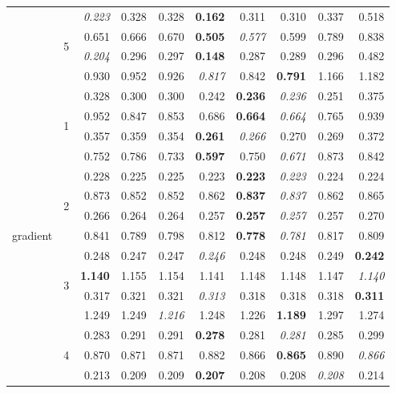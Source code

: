 \documentclass[authoryear, review, 11pt]{elsarticle}
\begin{document}
\begin{table}
\begin{center}
{\begin{tabular}{ccrrrrrrrr}
  \cline{3-10}
   & \multirow{4}{*}{5} & \emph{0.223} & 0.328 & 0.328 & \textbf{0.162} & 0.311 & 0.310 & 0.337 & 0.518 \\ 
   &  & 0.651 & 0.666 & 0.670 & \textbf{0.505} & \emph{0.577} & 0.599 & 0.789 & 0.838 \\ 
   &  & \emph{0.204} & 0.296 & 0.297 & \textbf{0.148} & 0.287 & 0.289 & 0.296 & 0.482 \\ 
   &  & 0.930 & 0.952 & 0.926 & \emph{0.817} & 0.842 & \textbf{0.791} & 1.166 & 1.182 \\ 
  \hline
  \multirow{20}{*}{gradient} & \multirow{4}{*}{1} & 0.328 & 0.300 & 0.300 & 0.242 & \textbf{0.236} & \emph{0.236} & 0.251 & 0.375 \\ 
   &  & 0.952 & 0.847 & 0.853 & 0.686 & \textbf{0.664} & \emph{0.664} & 0.765 & 0.939 \\ 
   &  & 0.357 & 0.359 & 0.354 & \textbf{0.261} & \emph{0.266} & 0.270 & 0.269 & 0.372 \\ 
   &  & 0.752 & 0.786 & 0.733 & \textbf{0.597} & 0.750 & \emph{0.671} & 0.873 & 0.842 \\ 
  \cline{3-10}
   & \multirow{4}{*}{2} & 0.228 & 0.225 & 0.225 & 0.223 & \textbf{0.223} & \emph{0.223} & 0.224 & 0.224 \\ 
   &  & 0.873 & 0.852 & 0.852 & 0.862 & \textbf{0.837} & \emph{0.837} & 0.862 & 0.865 \\ 
   &  & 0.266 & 0.264 & 0.264 & 0.257 & \textbf{0.257} & \emph{0.257} & 0.257 & 0.270 \\ 
   &  & 0.841 & 0.789 & 0.798 & 0.812 & \textbf{0.778} & \emph{0.781} & 0.817 & 0.809 \\ 
  \cline{3-10}
   & \multirow{4}{*}{3} & 0.248 & 0.247 & 0.247 & \emph{0.246} & 0.248 & 0.248 & 0.249 & \textbf{0.242} \\ 
   &  & \textbf{1.140} & 1.155 & 1.154 & 1.141 & 1.148 & 1.148 & 1.147 & \emph{1.140} \\ 
   &  & 0.317 & 0.321 & 0.321 & \emph{0.313} & 0.318 & 0.318 & 0.318 & \textbf{0.311} \\ 
   &  & 1.249 & 1.249 & \emph{1.216} & 1.248 & 1.226 & \textbf{1.189} & 1.297 & 1.274 \\ 
  \cline{3-10}
   & \multirow{4}{*}{4} & 0.283 & 0.291 & 0.291 & \textbf{0.278} & 0.281 & \emph{0.281} & 0.285 & 0.299 \\ 
   &  & 0.870 & 0.871 & 0.871 & 0.882 & 0.866 & \textbf{0.865} & 0.890 & \emph{0.866} \\ 
   &  & 0.213 & 0.209 & 0.209 & \textbf{0.207} & 0.208 & 0.208 & \emph{0.208} & 0.214 \\ 

\end{tabular}}
\end{center}
\end{table}
\end{document}
